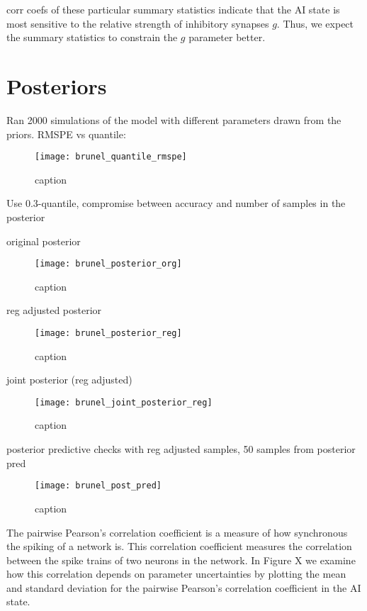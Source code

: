 corr coefs of these particular summary statistics indicate that the AI state is most sensitive to the relative strength of inhibitory synapses $g$. Thus, we expect the summary statistics to constrain the $g$ parameter better.


\section{Posteriors} 

Ran 2000 simulations of the model with different parameters drawn from the priors. RMSPE vs quantile: 

\begin{figure}[H]
    \centering
    \texttt{[image: brunel\_quantile\_rmspe]}
    \caption{caption}
    \label{fig:fig1}
\end{figure}

Use 0.3-quantile, compromise between accuracy and number of samples in the posterior

original posterior

\begin{figure}[H]
    \centering
    \texttt{[image: brunel\_posterior\_org]}
    \caption{caption}
    \label{fig:fig1}
\end{figure}

reg adjusted posterior

\begin{figure}[H]
    \centering
    \texttt{[image: brunel\_posterior\_reg]}
    \caption{caption}
    \label{fig:fig1}
\end{figure}


joint posterior (reg adjusted)

\begin{figure}[H]
    \centering
    \texttt{[image: brunel\_joint\_posterior\_reg]}
    \caption{caption}
    \label{fig:fig1}
\end{figure}

posterior predictive checks with reg adjusted samples, 50 samples from posterior pred

\begin{figure}[H]
    \centering
    \texttt{[image: brunel\_post\_pred]}
    \caption{caption}
    \label{fig:fig1}
\end{figure}

The pairwise Pearson's correlation coefficient is a measure of how synchronous the spiking of a network is. This correlation coefficient measures the correlation between the spike trains of two neurons in the network. In Figure X we examine how this correlation depends on parameter uncertainties by plotting the mean and standard deviation for the pairwise Pearson's correlation coefficient in the AI state.

